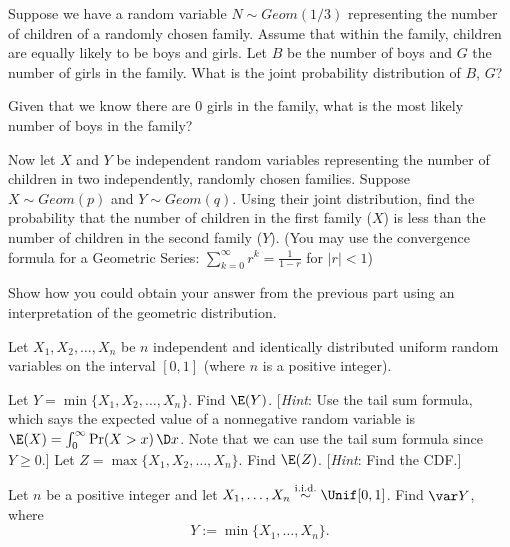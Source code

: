 

\begin{Parts}

\Part Suppose we have a random variable $N \sim Geom(1/3)$ representing the number of children of a randomly chosen family. Assume that within the family, children are equally likely to be boys and girls. Let $B$ be the number of boys and $G$ the number of girls in the family. What is the joint probability distribution of $B$, $G$?

\Part Given that we know there are $0$ girls in the family, what is the most likely number of boys in the family? 

\Part Now let $X$ and $Y$ be independent random variables representing the number of children in two independently, randomly chosen families. Suppose $X \sim Geom(p)$ and $Y \sim Geom(q)$. Using their joint distribution, find the probability that the number of children in the first family ($X$) is less than the number of children in the second family ($Y$). (You may use the convergence formula for a Geometric Series: $\sum_{k=0}^\infty r^k = \frac{1}{1-r}$ for $|r| < 1$)

\Part Show how you could obtain your answer from the previous part using an interpretation of the geometric distribution. 

\end{Parts}



Let $X_1, X_2, \dotsc, X_n$ be $n$ independent and identically distributed uniform random variables on the interval $[0, 1]$ (where $n$ is a positive integer).

\begin{Parts}
    \Part Let $Y = \min\{X_1, X_2, \dotsc, X_n\}$. Find $\E(Y)$. [\textit{Hint}: Use the tail sum formula, which says the expected value of a nonnegative random variable is $\E(X) = \int_0^{\infty} \Pr(X > x) \, \D x$. Note that we can use the tail sum formula since $Y \geq 0$.]
    \nosolspace{2cm}
	\Part Let $Z = \max\{X_1, X_2, \dotsc, X_n\}$. Find $\E(Z)$.
        [\textit{Hint}: Find the CDF.]
    \nosolspace{2cm}
\end{Parts}



Let $n$ be a positive integer and let $X_1,\dotsc,X_n \overset{\text{i.i.d.}}{\sim} \Unif[0, 1]$.
Find $\var Y$, where
$$Y := \min\{X_1,\dotsc,X_n\}.$$

